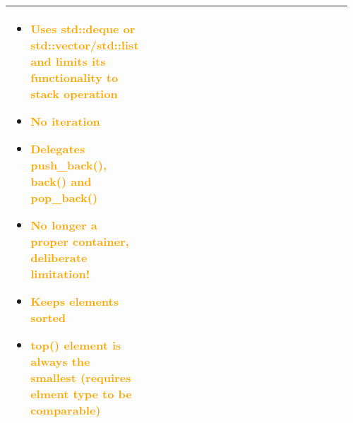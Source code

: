\documentclass[main.tex,fontsize=8pt,paper=a4,paper=portrait,DIV=calc]{scrartcl}
\begin{document}
\begin{table}[ht!]
\begin{tabular}{|m{0.2\linewidth}|m{0.755\linewidth}|}
\begin{itemize}
\item \textcolor{orange}{Uses std::deque or std::vector/std::list and limits its functionality to stack operation}
\item \textcolor{orange}{No iteration}
\item \textcolor{orange}{Delegates push\_back(), back() and pop\_back()}
\item \textcolor{orange}{No longer a proper container, \textbf{deliberate limitation!}}
\item \textcolor{orange}{Keeps elements sorted}
\item \textcolor{orange}{top() element is always the smallest (requires elment type to be comparable)}
\vspace{-2mm}
\end{itemize}\\
\hline
\end{tabular}
\end{table}
\pagebreak
\end{document}
